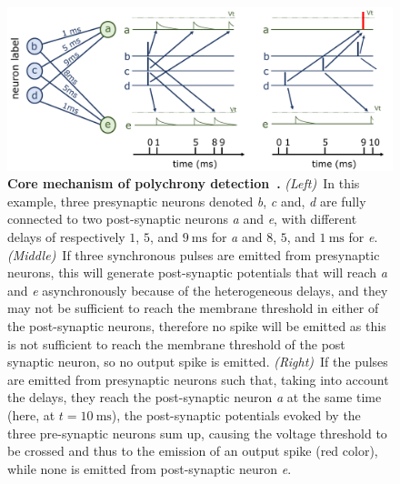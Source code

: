 \documentclass[runningheads]{llncs}
\newcommand{\ms}{\si{\milli\second}}%
\begin{document}
%
\begin{figure}[t]
  \centering
  \includegraphics[width=0.80\linewidth]{figures/izhikevich.pdf}%
    \caption{\textbf{Core mechanism of polychrony detection~\cite{izhikevich_polychronization_2006}.} \textit{(Left)}~In this example, three presynaptic neurons denoted \textit{b}, \textit{c} and, \textit{d} are fully connected to two post-synaptic neurons \textit{a} and \textit{e}, with different delays of respectively $1$, $5$, and $9~\ms$ for \textit{a} and  $8$, $5$, and $1~\ms$ for \textit{e}. \textit{(Middle)}~If three synchronous pulses are emitted from presynaptic neurons, this will generate post-synaptic potentials that will reach \textit{a} and \textit{e} asynchronously because of the heterogeneous delays, and they may not be sufficient to reach the membrane threshold in either of the post-synaptic neurons, therefore no spike will be emitted as this is not sufficient to reach the membrane threshold of the post synaptic neuron, so no output spike is emitted.     \textit{(Right)}~If the pulses are emitted from presynaptic neurons such that, taking into account the delays, they reach the post-synaptic neuron \textit{a} at the same time (here, at $t=10~\ms$),  the post-synaptic potentials evoked by the three pre-synaptic neurons sum up, causing the voltage threshold to be crossed and thus to the emission of an output spike (red color), while none is emitted from post-synaptic neuron \textit{e}.
     }
  \label{fig:izhikevich}
\end{figure}
\end{document}
